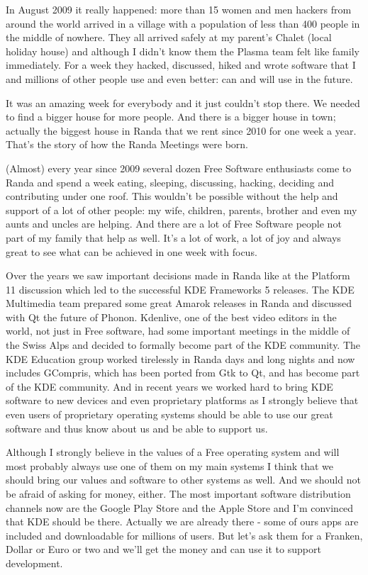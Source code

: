 In August 2009 it really happened: more than 15 women and men hackers from around the world arrived in a village with a population of less than 400 people in the middle of nowhere. They all arrived safely at my parent's Chalet (local holiday house) and although I didn't know them the Plasma team felt like family immediately. For a week they hacked, discussed, hiked and wrote software that I and millions of other people use and even better: can and will use in the future.

It was an amazing week for everybody and it just couldn't stop there. We needed to find a bigger house for more people. And there is a bigger house in town; actually the biggest house in Randa that we rent since 2010 for one week a year. That's the story of how the Randa Meetings were born.

(Almost) every year since 2009 several dozen Free Software enthusiasts come to Randa and spend a week eating, sleeping, discussing, hacking, deciding and contributing under one roof. This wouldn't be possible without the help and support of a lot of other people: my wife, children, parents, brother and even my aunts and uncles are helping. And there are a lot of Free Software people not part of my family that help as well. It's a lot of work, a lot of joy and always great to see what can be achieved in one week with focus.

Over the years we saw important decisions made in Randa like at the Platform 11 discussion which led to the successful KDE Frameworks 5 releases. The KDE Multimedia team prepared some great Amarok releases in Randa and discussed with Qt the future of Phonon. Kdenlive, one of the best video editors in the world, not just in Free software, had some important meetings in the middle of the Swiss Alps and decided to formally become part of the KDE community. The KDE Education group worked tirelessly in Randa days and long nights and now includes GCompris, which has been ported from Gtk to Qt, and has become part of the KDE community. And in recent years we worked hard to bring KDE software to new devices and even proprietary platforms as I strongly believe that even users of proprietary operating systems should be able to use our great software and thus know about us and be able to support us.

Although I strongly believe in the values of a Free operating system and will most probably always use one of them on my main systems I think that we should bring our values and software to other systems as well. And we should not be afraid of asking for money, either. The most important software distribution channels now are the Google Play Store and the Apple Store and I'm convinced that KDE should be there. Actually we are already there - some of ours apps are included and downloadable for millions of users. But let's ask them for a Franken, Dollar or Euro or two and we'll get the money and can use it to support development.

